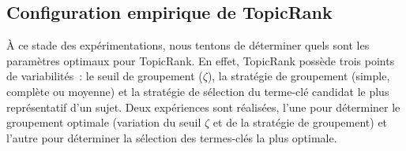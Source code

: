   \subsection{Configuration empirique de TopicRank}
  \label{subsection:configuration_empirique_de_topicrank}
    À ce stade des expérimentations, nous tentons de déterminer quels sont les
    paramètres optimaux pour TopicRank. En effet, TopicRank possède trois points
    de variabilités~: le seuil de groupement ($\zeta$), la stratégie de
    groupement (simple, complète ou moyenne) et la stratégie de sélection du
    terme-clé candidat le plus représentatif d'un sujet. Deux expériences sont
    réalisées, l'une pour déterminer le groupement optimale (variation du seuil
    $\zeta$ et de la stratégie de groupement) et l'autre pour déterminer la
    sélection des termes-clés la plus optimale.

